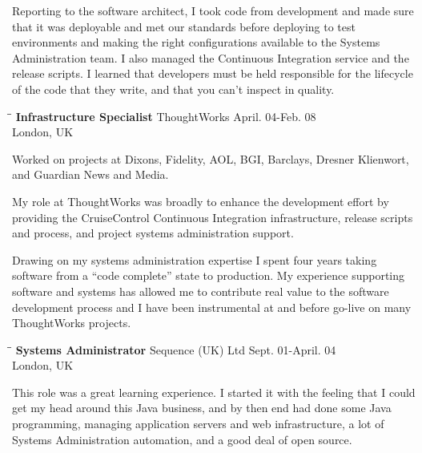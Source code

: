 \documentclass{res}
\begin{document}
\begin{resume}
Reporting to the software architect, I took code from development and made sure that it was deployable and met our standards before deploying to test environments and making the right configurations available to the Systems Administration team.  I also managed the Continuous Integration service and the release scripts.  I learned that developers must be held responsible for the lifecycle of the code that they write, and that you can't inspect in quality.

   \begin{tabbing}
   \hspace{2.3in}\= \hspace{2.6in}\= \kill %
    {\bf Infrastructure Specialist} \>ThoughtWorks \> April. 04-Feb. 08\\
                          \>London, UK
   \end{tabbing}\vspace{-20pt}
	Worked on projects at Dixons, Fidelity, AOL, BGI, Barclays, Dresner Klienwort, and Guardian News and Media.
	
     My role at ThoughtWorks was broadly to enhance the development effort by providing the CruiseControl Continuous Integration infrastructure, release scripts and process, and project systems administration support.

	Drawing on my systems administration expertise I spent four years taking software from a ``code complete'' state to production.  My experience supporting software and systems has allowed me to contribute real value to the software development process and I have been instrumental at and before go-live on many ThoughtWorks projects.

	\begin{tabbing}
	   \hspace{2.3in}\= \hspace{2.6in}\= \kill %
	    {\bf Systems Administrator} \>Sequence (UK) Ltd \> Sept. 01-April. 04\\
	                          \>London, UK
	   \end{tabbing}\vspace{-20pt}
	This role was a great learning experience.  I started it with the feeling that I could get my head around this Java business, and by then end had done some Java programming, managing application servers and web infrastructure, a lot of Systems Administration automation, and a good deal of open source.


\end{resume}
\end{document}
